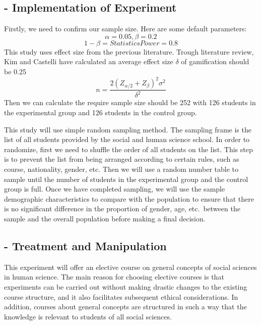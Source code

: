 \documentclass[12pt]{article} %
\begin{document}
\subsection*{- Implementation of Experiment}

\vspace{.3cm}

\noindent Firstly, we need to confirm our sample size. Here are some default parameters:
\begin{equation}
	\alpha = 0.05, \beta = 0.2
\end{equation}
\begin{equation}
	1 - \beta = StatisticsPower = 0.8
\end{equation}
\noindent This study uses effect size from the previous literature. Trough literature review, Kim and Castelli have calculated an average effect size 
$\delta$ of gamification should be 0.25 \citep{kim2021effects}
\begin{equation}
	n = \frac{{2(Z_{\alpha/2} + Z_{\beta})^2 \sigma^2}}{{\delta^2}}
\end{equation}
Then we can calculate the require sample size should be 252 with 126 students in the experimental group and 126 students in the control group.
\par
\noindent This study will use simple random sampling method. The sampling frame is the list of all students provided by the social and human science school. In order to randomize, first we need to shuffle the order of all students on the list. This step is to prevent the list from being arranged according to certain rules, such as course, nationality, gender, etc. Then we will use a random number table to sample until the number of students in the experimental group and the control group is full. Once we have completed sampling, we will use the sample demographic characteristics to compare with the population to ensure that there is no significant difference in the proportion of gender, age, etc.\ between the sample and the overall population before making a final decision.

\subsection*{- Treatment and Manipulation}

\vspace{.3cm}

\noindent This experiment will offer an elective course on general concepts of social sciences in human science. The main reason for choosing elective courses is that experiments can be carried out without making drastic changes to the existing course structure, and it also facilitates subsequent ethical considerations. In addition, courses about general concepts are structured in such a way that the knowledge is relevant to students of all social sciences.
\end{document}
